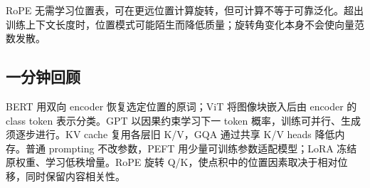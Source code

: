 RoPE 无需学习位置表，可在更远位置计算旋转，但可计算不等于可靠泛化。超出训练上下文长度时，位置模式可能陌生而降低质量；旋转角变化本身不会使向量范数发散。

\subsection{一分钟回顾}

BERT 用双向 encoder 恢复选定位置的原词；ViT 将图像块嵌入后由 encoder 的 class token 表示分类。GPT 以因果约束学习下一 token 概率，训练可并行、生成须逐步进行。KV cache 复用各层旧 K/V，GQA 通过共享 K/V heads 降低内存。普通 prompting 不改参数，PEFT 用少量可训练参数适配模型；LoRA 冻结原权重、学习低秩增量。RoPE 旋转 Q/K，使点积中的位置因素取决于相对位移，同时保留内容相关性。
